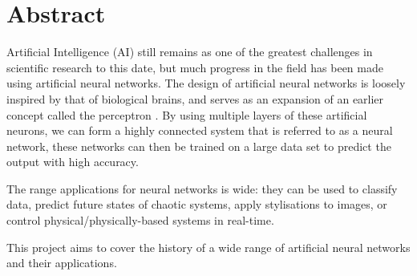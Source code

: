 \chapter*{Abstract}

Artificial Intelligence (AI) still remains as one of the greatest challenges in
scientific research to this date, but much progress in the field has been made
using artificial neural networks.
The design of artificial neural networks is loosely inspired by that of
biological brains, and serves as an expansion of an earlier concept called the
perceptron \citep{Rosenblatt:1958:Perceptron}.
By using multiple layers of these artificial neurons, we can form a highly
connected system that is referred to as a neural network,
these networks can then be trained on a large data set to predict the output
with high accuracy.

The range applications for neural networks is wide: they can be used to classify
data, predict future states of chaotic systems, apply stylisations to images,
or control physical/physically-based systems in real-time.

This project aims to cover the history of a wide range of artificial neural
networks and their applications.
